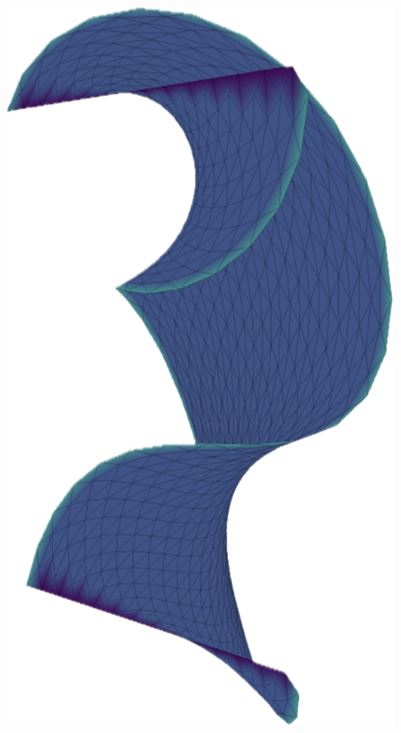\begin{figure}[!h]
    \includegraphics[width=0.8\columnwidth]{../images/helix_BC.png}\vspace*{-50mm}

\end{figure}

